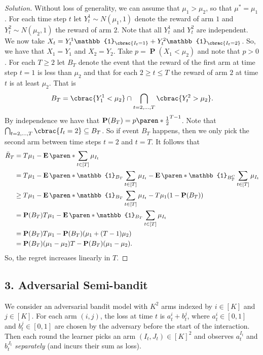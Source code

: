 \documentclass[10pt, a4paper, twoside]{amsart}
\theoremstyle{plain}
\DeclarePairedDelimiter\cbrac\{\}
\DeclarePairedDelimiter\paren()
\newcommand{\se}{\ensuremath{\subseteq}}
\newcommand{\Ind}{\ensuremath{\mathbb{1}}}
\renewcommand{\P}{\operatorname*{\ensuremath{\mathbf{P}}}} %
\newcommand{\Ev}{\operatorname*{\ensuremath{\mathbf{E}}}} %
\newenvironment{solution}
               {\let\oldqedsymbol=\qedsymbol
                \renewcommand{\qedsymbol}{$\blacktriangleleft$}
                \begin{proof}[Solution]}
               {\end{proof}
                \renewcommand{\qedsymbol}{\oldqedsymbol}}
\begin{document}
\begin{solution}
Without loss of generality, we can assume that $\mu_1 > \mu_2$, so that $\mu^*=\mu_1$.
For each time step $t$ let $Y_t^1 \sim N(\mu_1, 1)$ denote the reward of arm $1$ and $Y_t^2 \sim N(\mu_2, 1)$ the reward of arm $2$. Note that all $Y_t^1$ and $Y_t^2$ are independent. We now take $X_t=Y_t^1 \Ind_{\cbrac{I_t=1}}+Y_t^2 \Ind_{\cbrac{I_t=2}}$.
So, we have that $X_1 = Y_1$ and $X_2=Y_2$. Take $p=\P(X_1 < \mu_2)$ and note that $p > 0$.
For each $T \geq 2$ let $B_T$ denote the event that the reward of the first arm at time step $t=1$ is less than $\mu_2$ and 
that for each $2 \geq t \leq T$ the reward of arm $2$ at time $t$ is at least $\mu_2$. That is
\begin{equation*}
 B_T= \cbrac{Y^1_1 < \mu_2} \cap \bigcap_{t=2,\ldots,T}\cbrac{Y_t^2 > \mu_2}.
\end{equation*}
By independence we have that $\P(B_T)=p\paren*{\tfrac{1}{2}}^{T-1}$.
Note that $\bigcap_{t=2,\ldots,T}\cbrac{I_t=2} \se B_T$. 
So if event $B_T$ happens, then we only pick the second arm between time steps $t=2$ and $t=T$.
It follows that 
\begin{align*}
 \bar{R}_T &= T \mu_1 - \Ev\paren*{\sum_{t \in [T]} \mu_{I_t}} \\
 &= T \mu_1 - \Ev\paren*{\Ind_{B_T}\sum_{t \in [T]} \mu_{I_t}}-\Ev\paren*{\Ind_{B_T^C}\sum_{t \in [T]} \mu_{I_t}} \\
 &\geq T \mu_1 - \Ev\paren*{\Ind_{B_T}\sum_{t \in [T]} \mu_{I_t}}-T\mu_1(1-\P(B_T)) \\
 &= \P(B_T)T \mu_1 - \Ev\paren*{\Ind_{B_T}\sum_{t \in [T]} \mu_{I_t}} \\
 &= \P(B_T)T \mu_1 - \P(B_T)(\mu_1+(T-1)\mu_{2})  \\
 &= \P(B_T) (\mu_1-\mu_2)T - \P(B_T)(\mu_1-\mu_2).
\end{align*}
So, the regret increases linearly in $T$.
\end{solution}



\subsection*{3. Adversarial Semi-bandit}
We consider an adversarial bandit model with $K^2$ arms indexed by $i \in [K]$ and $j \in [K]$. For each arm $(i,j)$, the loss at time $t$ is $a_t^i + b_t^j$, where $a_t^i \in [0,1]$ and $b_t^j \in [0,1]$ are chosen by the adversary before the start of the interaction. Then each round the learner picks an arm $(I_t, J_t) \in [K]^2$ and observes $a_t^{I_t}$ and $b_t^{J_t}$ \textit{separately} (and incurs their sum as loss).
\end{document}
